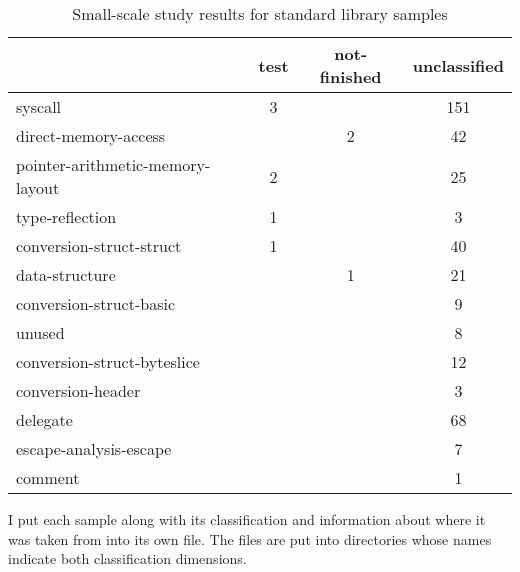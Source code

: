 \begin{table}[h]
    \centering
    \caption{Small-scale study results for standard library samples}
    \label{tbl:survey-small-results-std}
    \begin{tabularx}{\textwidth}{Xccc}
        \toprule
                                          & test & not-finished &  unclassified \\
        \midrule
                                  syscall &    3 &              &           151 \\
        \rowcolor{verylightgray}
                     direct-memory-access &      &            2 &            42 \\
         pointer-arithmetic-memory-layout &    2 &              &            25 \\
        \rowcolor{verylightgray}
                          type-reflection &    1 &              &             3 \\
                 conversion-struct-struct &    1 &              &            40 \\
        \rowcolor{verylightgray}
                           data-structure &      &            1 &            21 \\
                  conversion-struct-basic &      &              &             9 \\
        \rowcolor{verylightgray}
                                   unused &      &              &             8 \\
              conversion-struct-byteslice &      &              &            12 \\
        \rowcolor{verylightgray}
                        conversion-header &      &              &             3 \\
                                 delegate &      &              &            68 \\
        \rowcolor{verylightgray}
                   escape-analysis-escape &      &              &             7 \\
                                  comment &      &              &             1 \\
        \bottomrule
    \end{tabularx}
\end{table}

I put each sample along with its classification and information about where it was taken from into its own file.
The files are put into directories whose names indicate both classification dimensions.



